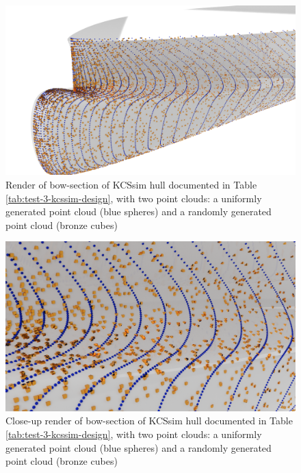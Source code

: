\documentclass{report}
\begin{document}
\begin{figure}[H]
    \centering
    \includegraphics[width = 0.7\linewidth]{figures/test-3-kcssim-random-uniform-render.png}
    \caption{Render of bow-section of KCSsim hull documented in Table \ref{tab:test-3-kcssim-design},
    with two point clouds: a uniformly generated point cloud (blue spheres) and a randomly generated 
    point cloud (bronze cubes)}
    \label{fig:test-3-kcssim-random-uniform-render}
\end{figure}
\begin{figure}[H]
    \centering
    \includegraphics[width = 0.7\linewidth]{figures/test-3-kcssim-random-uniform-render-close-up.png}
    \caption{Close-up render of bow-section of KCSsim hull documented in Table \ref{tab:test-3-kcssim-design},
    with two point clouds: a uniformly generated point cloud (blue spheres) and a randomly generated 
    point cloud (bronze cubes)}
    \label{fig:test-3-kcssim-random-uniform-render-close-up}
\end{figure}
\end{document}
